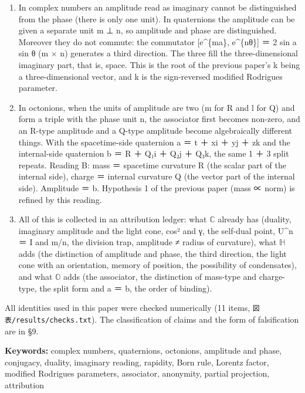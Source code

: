 \documentclass[
  a4paper,
]{article}
\begin{document}
\begin{enumerate}
  rule and the invariance of the speed of light are two sections of this
  single axiom.
\item
  In complex numbers an amplitude read as imaginary cannot be
  distinguished from the phase (there is only one unit). In quaternions
  the amplitude can be given a separate unit m ⊥ n, so amplitude and
  phase are distinguished. Moreover they do not commute: the commutator
  {[}e\^{}\{ma\}, e\^{}\{nθ\}{]} ＝ 2 sin a sin θ (m × n) generates a
  third direction. The three fill the three-dimensional imaginary part,
  that is, space. This is the root of the previous paper's k being a
  three-dimensional vector, and k is the sign-reversed modified
  Rodrigues parameter.
\item
  In octonions, when the units of amplitude are two (m for R and l for
  Q) and form a triple with the phase unit n, the associator first
  becomes non-zero, and an R-type amplitude and a Q-type amplitude
  become algebraically different things. With the spacetime-side
  quaternion a ＝ t ＋ xi ＋ yj ＋ zk and the internal-side quaternion b
  ＝ R ＋ Q₁i ＋ Q₂j ＋ Q₃k, the same 1 ＋ 3 split repeats. Reading B:
  mass ＝ spacetime curvature R (the scalar part of the internal side),
  charge ＝ internal curvature Q (the vector part of the internal side).
  Amplitude ＝ \textbar b\textbar. Hypothesis 1 of the previous paper
  (mass ∝ norm) is refined by this reading.
\item
  All of this is collected in an attribution ledger: what \(\mathbb{C}\)
  already has (duality, imaginary amplitude and the light cone, cos² and
  γ, the self-dual point, U\^{}n ＝ I and m/n, the division trap,
  amplitude ≠ radius of curvature), what \(\mathbb{H}\) adds (the
  distinction of amplitude and phase, the third direction, the light
  cone with an orientation, memory of position, the possibility of
  condensates), and what \(\mathbb{O}\) adds (the associator, the
  distinction of mass-type and charge-type, the split form and
  \textbar a\textbar{} ＝ \textbar b\textbar, the order of binding).
\end{enumerate}

All identities used in this paper were checked numerically (11 items,
\texttt{図表/\allowbreak{}results/\allowbreak{}checks.txt}). The classification of claims and the
form of falsification are in §9.

\textbf{Keywords:} complex numbers, quaternions, octonions, amplitude
and phase, conjugacy, duality, imaginary reading, rapidity, Born rule,
Lorentz factor, modified Rodrigues parameters, associator, anonymity,
partial projection, attribution
\end{document}
